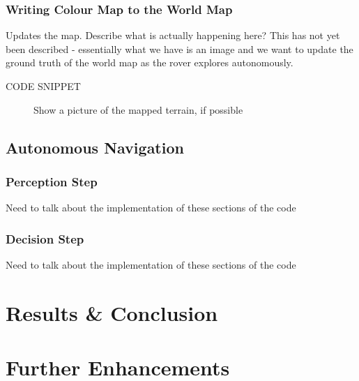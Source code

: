 \documentclass[a4paper]{article}
\begin{document}
\subsubsection{Writing Colour Map to the World Map}

Updates the map. Describe what is actually happening here? This has not yet been described - essentially what we have is an image and we want to update the ground truth of the world map as the rover explores autonomously.

CODE SNIPPET

\begin{figure}
\centering
\caption{Show a picture of the mapped terrain, if possible}
\end{figure}

\subsection{Autonomous Navigation}
\subsubsection{Perception Step}
Need to talk about the implementation of these sections of the code

\subsubsection{Decision Step}
Need to talk about the implementation of these sections of the code

\section{Results \& Conclusion}

\section{Further Enhancements}
\end{document}
